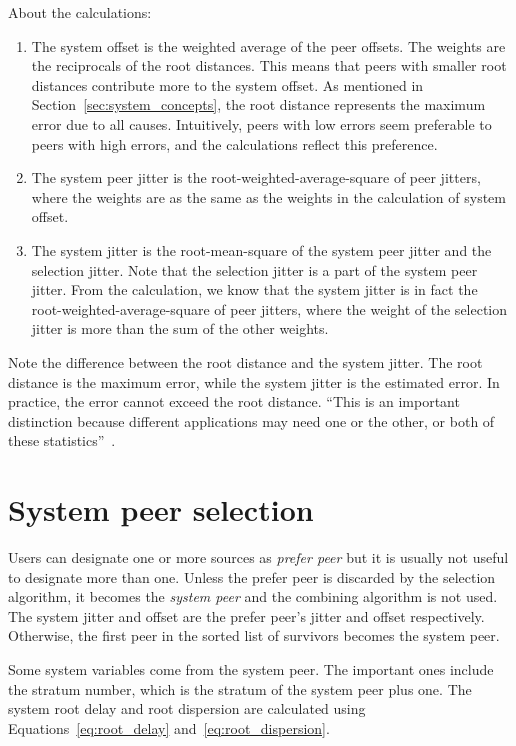 About the calculations:
\begin{enumerate}
    \item The system offset is the weighted average of the peer offsets. The
        weights are the reciprocals of the root distances. This means that
        peers with smaller root distances contribute more to the system offset. As
        mentioned in Section~\ref{sec:system_concepts}, the root distance
        represents the maximum error due to all causes.  Intuitively, peers
        with low errors seem preferable to peers with high errors, and the
        calculations reflect this preference.
    \item The system peer jitter is the root-weighted-average-square of peer
        jitters, where the weights are as the same as the weights in the
        calculation of system offset.
    \item The system jitter is the root-mean-square of the system peer jitter
        and the selection jitter. Note that the selection jitter is a part of
        the system peer jitter. From the calculation, we know that the system
        jitter is in fact the root-weighted-average-square of peer jitters,
        where the weight of the selection jitter is more than the sum of the
        other weights.
\end{enumerate}
Note the difference between the root distance and the system jitter. The root
distance is the maximum error, while the system jitter is the estimated error.
In practice, the error cannot exceed the root distance. ``This is an important
distinction because different applications may need one or the other, or both
of these statistics''~\cite{redbook}.

\section{System peer selection}%
\label{sec:system_peer_selection}
Users can designate one or more sources as \emph{prefer peer} but it is
usually not useful to designate more than one. Unless the prefer peer is
discarded by the selection algorithm, it becomes the \emph{system peer} and
the combining algorithm is not used. The system jitter and offset are the
prefer peer's jitter and offset respectively. Otherwise, the first peer in
the sorted list of survivors becomes the system peer. 

Some system variables come from the system peer. The important ones
include the stratum number, which is the stratum of the system peer plus one.
The system root delay and root dispersion are calculated using
Equations~\ref{eq:root_delay} and~\ref{eq:root_dispersion}.

